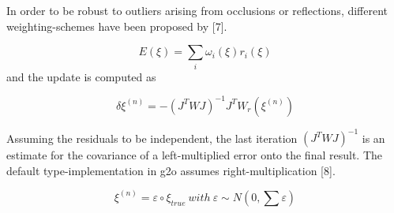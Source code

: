 In order to be robust to outliers arising from occlusions or reflections, different weighting-schemes have been proposed by [7].

\begin{equation}
E(\xi)=\sum\limits_i \omega_{i}(\xi)r_{i}(\xi)
\end{equation}
and the update is computed as

\begin{equation}
\delta {\xi ^{(n)}} =  - (J^{T}WJ)^{ - 1}J^{T}W_{r}({\xi ^{(n)}})
\end{equation}

Assuming the residuals to be independent, the last iteration ${({J^T}WJ)^{ - 1}}$ is an estimate for the covariance   of a left-multiplied error onto the final result. The default type-implementation in g2o assumes right-multiplication [8].

\begin{equation}
\xi ^{(n)} = \varepsilon  \circ \xi _{true} \ with \ \varepsilon \sim N(0,\sum \varepsilon  )
\end{equation}




